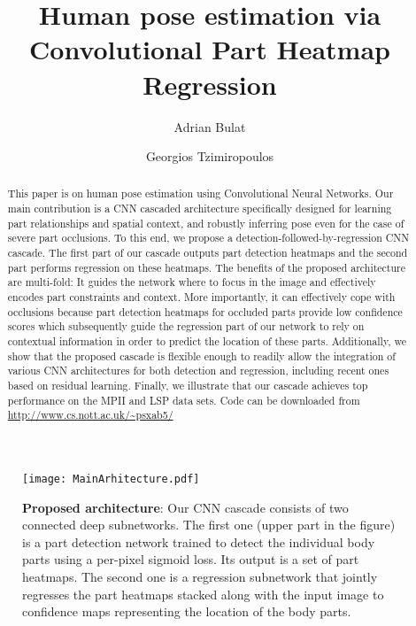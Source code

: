 \documentclass[runningheads]{llncs}
\begin{document}
\pagestyle{headings}
\mainmatter

\title{Human pose estimation via Convolutional Part Heatmap Regression} 



\author{
	Adrian Bulat 
	\and 
    Georgios Tzimiropoulos
}





\maketitle

\begin{abstract}
This paper is on human pose estimation using Convolutional Neural Networks. Our main contribution is a CNN cascaded architecture specifically designed for learning part relationships and spatial context, and robustly inferring pose even for the case of severe part occlusions. To this end, we propose a detection-followed-by-regression CNN cascade. The first part of our cascade outputs part detection heatmaps and the second part performs regression on these heatmaps. The benefits of the proposed architecture are multi-fold: It guides the network where to focus in the image and effectively encodes part constraints and context. More importantly, it can effectively cope with occlusions because part detection heatmaps for occluded parts provide low confidence scores which subsequently guide the regression part of our network to rely on contextual information in order to predict the location of these parts. Additionally, we show that the proposed cascade is flexible enough to readily allow the integration of various CNN architectures for both detection and regression, including recent ones based on residual learning. Finally, we illustrate that our cascade achieves top performance on the MPII and LSP data sets. Code can be downloaded from  \url{http://www.cs.nott.ac.uk/~psxab5/}

\end{abstract}

\begin{figure}
\centering 
\texttt{[image: MainArhitecture.pdf]}
\caption{\textbf{Proposed architecture}: Our CNN cascade consists of two connected deep subnetworks. The first one (upper part in the figure) is a part detection network trained to detect the individual body parts using a per-pixel sigmoid loss. Its output is a set of  part heatmaps. The second one is a regression subnetwork that jointly regresses the part  heatmaps stacked along with the input image to confidence maps representing the location of the body parts.}
\label{fig:OurNetworkFArchFull}
\end{figure}  
\end{document}
